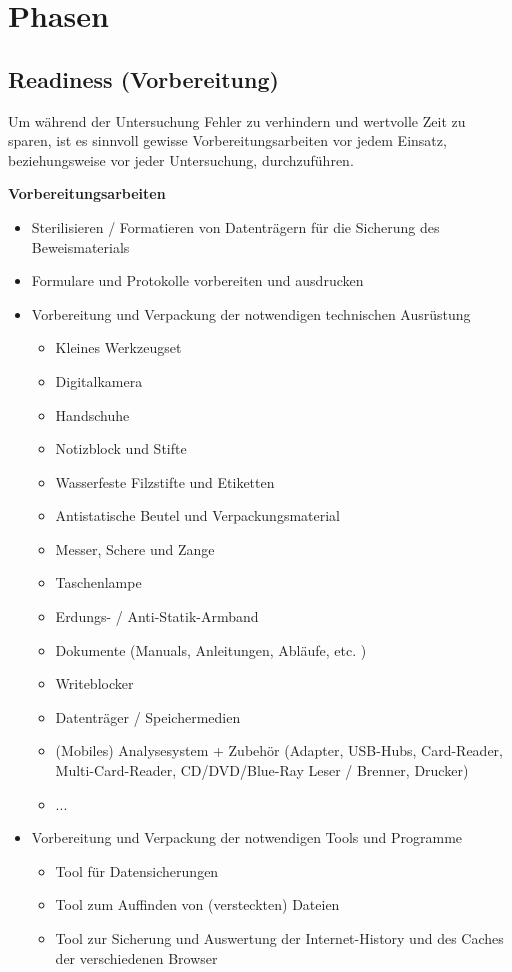 \section{Phasen}
\subsection{Readiness (Vorbereitung)}
Um während der Untersuchung Fehler zu verhindern und wertvolle Zeit zu sparen, ist es sinnvoll gewisse Vorbereitungsarbeiten vor jedem Einsatz, beziehungsweise vor jeder Untersuchung, durchzuführen.

\textbf{Vorbereitungsarbeiten}
\begin{itemize}
\item Sterilisieren / Formatieren von Datenträgern für die Sicherung des Beweismaterials
\item Formulare und Protokolle vorbereiten und ausdrucken
\item Vorbereitung und Verpackung der notwendigen technischen Ausrüstung
\begin{itemize}
\item Kleines Werkzeugset
\item Digitalkamera
\item Handschuhe
\item Notizblock und Stifte
\item Wasserfeste Filzstifte und Etiketten
\item Antistatische Beutel und Verpackungsmaterial
\item Messer, Schere und Zange
\item Taschenlampe
\item Erdungs- / Anti-Statik-Armband
\item Dokumente (Manuals, Anleitungen, Abläufe, etc. )
\item Writeblocker
\item Datenträger / Speichermedien
\item (Mobiles) Analysesystem + Zubehör (Adapter, USB-Hubs, Card-Reader, Multi-Card-Reader, CD/DVD/Blue-Ray Leser / Brenner, Drucker)
\item ...
\end{itemize}
\item Vorbereitung und Verpackung der notwendigen Tools und Programme
\begin{itemize}
\item Tool für Datensicherungen
\item Tool zum Auffinden von (versteckten) Dateien
\item Tool zur Sicherung und Auswertung der Internet-History und des Caches der verschiedenen Browser

\end{itemize}
\end{itemize}
